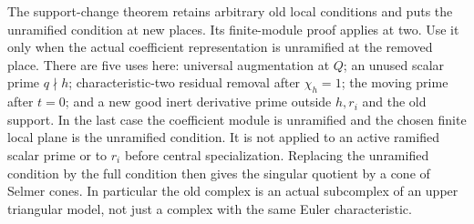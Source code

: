 \documentclass[11pt]{article}
\theoremstyle{definition}
\theoremstyle{remark}
\begin{document}
The support-change theorem \cite[Proposition 7.8.8(ii)]{nekovar}
retains arbitrary old local conditions and puts the unramified
condition at new places. Its finite-module proof applies at two.
Use it only when the actual coefficient representation is unramified
at the removed place. There are five uses here:
universal augmentation at $Q$; an unused scalar prime $q\nmid h$;
characteristic-two residual removal after $\chi_h=1$; the moving
prime after $t=0$; and a new good inert derivative prime outside
$h,r_i$ and the old support. In the last case the coefficient module
is unramified and the chosen finite local plane is the unramified
condition. It is not applied to an active ramified scalar prime
or to $r_i$ before central specialization. Replacing the unramified
condition by the full condition then gives the singular quotient
by a cone of Selmer cones. In particular the old complex is an actual
subcomplex of an upper triangular model, not just a complex with the
same Euler characteristic.
\end{document}
